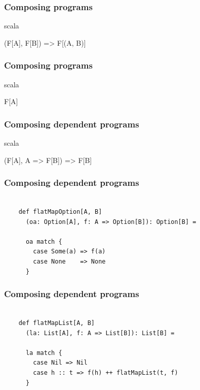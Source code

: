 \documentclass{beamer}
\begin{document}
\begin{frame}[fragile]

  \frametitle{Composing programs}

  \centering
  \Large

  \begin{cminted}{scala}

(F[A], F[B]) => F[(A, B)]

  \end{cminted}

\end{frame}

\begin{frame}[fragile]

  \frametitle{Composing programs}

  \centering
  \Large

  \begin{cminted}{scala}

F[A]

  \end{cminted}

\end{frame}

\begin{frame}[fragile]

  \frametitle{Composing dependent programs}

  \centering
  \Large

  \begin{cminted}{scala}

(F[A], A => F[B]) => F[B]

  \end{cminted}

\end{frame}

\begin{frame}[fragile]

  \frametitle{Composing dependent programs}

  \begin{verbatim}

    def flatMapOption[A, B]
      (oa: Option[A], f: A => Option[B]): Option[B] =

      oa match {
        case Some(a) => f(a)
        case None    => None
      }

  \end{verbatim}

\end{frame}

\begin{frame}[fragile]

  \frametitle{Composing dependent programs}

  \begin{verbatim}

    def flatMapList[A, B]
      (la: List[A], f: A => List[B]): List[B] =

      la match {
        case Nil => Nil
        case h :: t => f(h) ++ flatMapList(t, f)
      }

  \end{verbatim}

\end{frame}
\end{document}
